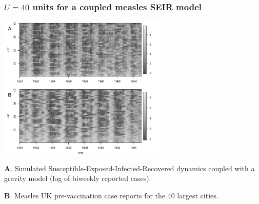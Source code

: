 \documentclass{beamer}
\begin{document}
\begin{frame}
\frametitle{$U=40$ units for a coupled measles SEIR model}

\vspace{-2.7mm}

\begin{center}
\includegraphics[width=8cm]{slice_image_plot-1.pdf}
\end{center}

\vspace{-3mm}

{\bf A}. Simulated Susceptible-Exposed-Infected-Recovered dynamics coupled with a gravity model (log of biweekly reported cases).

{\bf B}. Measles UK pre-vaccination case reports for the 40 largest cities.





\end{frame}
\end{document}
